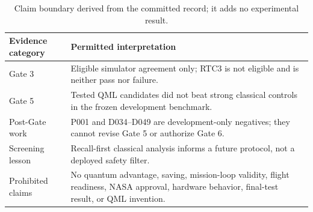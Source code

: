 \begin{table}[t]
\caption{Claim boundary derived from the committed record; it adds no experimental result.}
\label{tab:claim-boundary}
\centering
\scriptsize
\renewcommand{\arraystretch}{0.90}
\begin{tabularx}{\textwidth}{@{}p{}X@{}}
\toprule
Evidence category & Permitted interpretation \\
\midrule
Gate 3 & Eligible simulator agreement only; RTC3 is not eligible and is neither pass nor failure. \\
Gate 5 & Tested QML candidates did not beat strong classical controls in the frozen development benchmark. \\
Post-Gate work & P001 and D034--D049 are development-only negatives; they cannot revise Gate 5 or authorize Gate 6. \\
Screening lesson & Recall-first classical analysis informs a future protocol, not a deployed safety filter. \\
Prohibited claims & No quantum advantage, saving, mission-loop validity, flight readiness, NASA approval, hardware behavior, final-test result, or QML invention. \\
\bottomrule
\end{tabularx}
\renewcommand{\arraystretch}{1}
\end{table}
